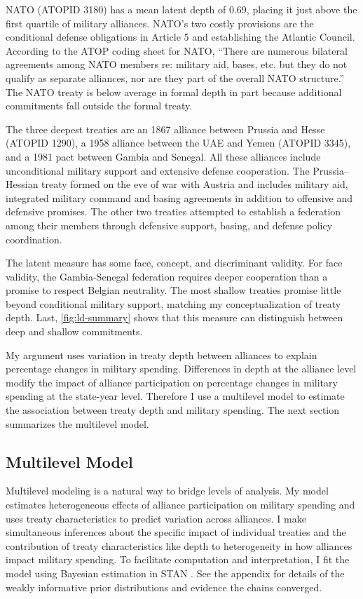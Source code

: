 \documentclass[12pt]{article}
\begin{document}
NATO (ATOPID 3180) has a mean latent depth of 0.69, placing it just above the first quartile of military alliances. 
NATO's two costly provisions are the conditional defense obligations in Article 5 and establishing the Atlantic Council. 
According to the ATOP coding sheet for NATO, ``There are numerous bilateral agreements among NATO members re: military aid, bases, etc. but they do not qualify as separate alliances, nor are they part of the overall NATO structure.''
The NATO treaty is below average in formal depth in part because additional commitments fall outside the formal treaty.    


The three deepest treaties are an 1867 alliance between Prussia and Hesse (ATOPID 1290), a 1958 alliance between the UAE and Yemen (ATOPID 3345), and a 1981 pact between Gambia and Senegal. 
All these alliances include unconditional military support and extensive defense cooperation. 
The Prussia--Hessian treaty formed on the eve of war with Austria and includes military aid, integrated military command and basing agreements in addition to offensive and defensive promises. 
The other two treaties attempted to establish a federation among their members through defensive support, basing, and defense policy coordination. 


The latent measure has some face, concept, and discriminant validity. 
For face validity, the Gambia-Senegal federation requires deeper cooperation than a promise to respect Belgian neutrality. 
The most shallow treaties promise little beyond conditional military support, matching my conceptualization of treaty depth. 
Last, \autoref{fig:ld-summary} shows that this measure can distinguish between deep and shallow commitments. 


My argument uses variation in treaty depth between alliances to explain percentage changes in military spending.
Differences in depth at the alliance level modify the impact of alliance participation on percentage changes in military spending at the state-year level. 
Therefore I use a multilevel model to estimate the association between treaty depth and military spending.  
The next section summarizes the multilevel model. 


\subsection{Multilevel Model} 


Multilevel modeling is a natural way to bridge levels of analysis.
My model estimates heterogeneous effects of alliance participation on military spending and uses treaty characteristics to predict variation across alliances. 
I make simultaneous inferences about the specific impact of individual treaties and the contribution of treaty characteristics like depth to heterogeneity in how alliances impact military spending. 
To facilitate computation and interpretation, I fit the model using Bayesian estimation in STAN \citep{Carpenteretal2016}. 
See the appendix for details of the weakly informative prior distributions and evidence the chains converged.
\end{document}
